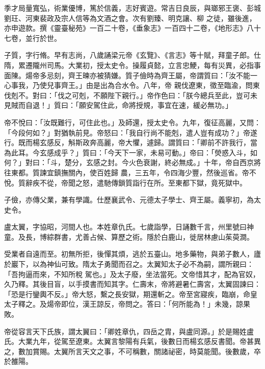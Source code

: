 \begin{pinyinscope}
季才局量寬弘，術業優博，篤於信義，志好賓遊。常吉日良辰，與瑯邪王褒、彭城劉玨、河東裴政及宗人信等為文酒之會。次有劉臻、明克讓、柳
 之徒，雖後進，亦申遊款。撰《靈臺秘苑》一百二十卷，《垂象志》一百四十二卷，《地形志》八十七卷，並行於世。



 子質，字行脩。早有志尚，八歲誦梁元帝《玄覽》、《言志》等十賦，拜童子郎。仕隋，累遷隴州司馬。大業初，授太史令。操履貞懿，立言忠鯁，每有災異，必指事面陳。煬帝多忌刻，齊王暕亦被猜嫌。質子儉時為齊王屬，帝謂質曰：「汝不能一心事我，乃使兒事齊王。」由是出為合水令。八年，帝
 親伐遼東，徵至臨渝，問東伐剋不。對曰：「伐之可剋，不願陛下親行。」帝作色曰：「朕今總兵至此，豈可未見賊而自退！」質曰：「願安駕住此，命將授規，事宜在速，緩必無功。」



 帝不悅曰：「汝既難行，可住此也。」及師還，授太史令。九年，復征高麗，又問：「今段何如？」對猶執前見。帝怒曰：「我自行尚不能剋，遣人豈有成功？」帝遂行。既而楊玄感反，斛斯政奔高麗，帝大懼，遽歸。謂質曰：「卿前不許我行，當為此耳。今玄感成乎？」質曰：「今天下一家，未易可動。」帝曰：「熒惑入斗，如何？」對曰：「斗，楚分，玄感之封。今火色衰謝，終必無成。」十年，帝自西京將往東都。質諫宜鎮撫關內，使百姓歸
 農，三五年，令四海少豐，然後巡省。帝不悅。質辭疾不從，帝聞之怒，遣馳傳鎖質詣行在所。至東都下獄，竟死獄中。



 子儉，亦傳父業，兼有學識。仕歷襄武令、元德太子學士、齊王屬。義寧初，為太史令。



 盧太翼，字協昭，河間人也。本姓章仇氏。七歲詣學，日誦數千言，州里號曰神童。及長，博綜群書，尤善占候、算歷之術。隱於白鹿山，徙居林慮山茱萸澗。



 受業者自遠而至。初無所拒，後憚其煩，逃於五臺山。地多藥物，與弟子數人，廬於巖下，以為神仙可致。隋太子勇聞而召之。太翼知太子必不為嗣，謂所親曰：「吾拘逼而來，不知所稅
 駕也。」及太子廢，坐法當死。文帝惜其才，配為官奴，久乃釋。其後目盲，以手摸書而知其字。仁壽末，帝將避暑仁壽宮，太翼固諫曰：「恐是行鑾輿不反。」帝大怒，繫之長安獄，期還斬之。帝至宮寢疾，臨崩，命皇太子釋之。及煬帝即位，漢王諒反，帝問之。答曰：「何所能為！」未幾，諒果敗。



 帝從容言天下氏族，謂太翼曰：「卿姓章仇，四岳之胄，與盧同源。」於是賜姓盧氏。大業九年，從駕至遼東。太翼言黎陽有兵氣，後數日而楊玄感反書聞。帝甚異之，數加賞賜。太翼所言天文之事，不可稱數，關諸祕密，時莫能聞。後數歲，卒於雒陽。




\end{pinyinscope}
